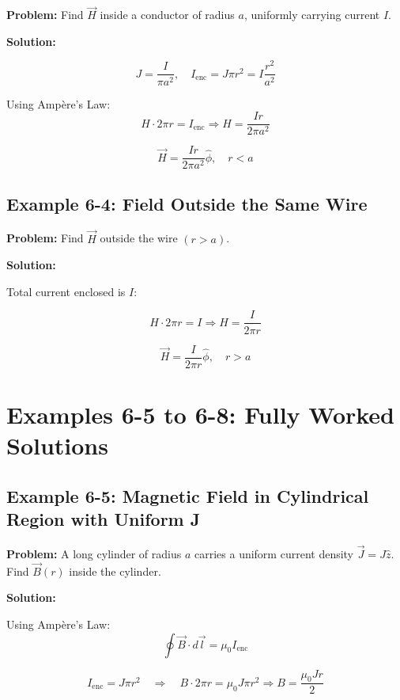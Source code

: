 \documentclass[12pt]{article}
\begin{document}
\textbf{Problem:}  
Find \( \vec{H} \) inside a conductor of radius \( a \), uniformly carrying current \( I \).

\textbf{Solution:}

\[
J = \frac{I}{\pi a^2}, \quad I_{\text{enc}} = J \pi r^2 = I \frac{r^2}{a^2}
\]

Using Ampère’s Law:
\[
H \cdot 2\pi r = I_{\text{enc}} \Rightarrow H = \frac{I r}{2\pi a^2}
\]

\begin{tcolorbox}
\[
\boxed{\vec{H} = \frac{I r}{2\pi a^2} \hat{\phi}}, \quad r < a
\]
\end{tcolorbox}

\subsection*{Example 6-4: Field Outside the Same Wire}

\textbf{Problem:}  
Find \( \vec{H} \) outside the wire \( (r > a) \).

\textbf{Solution:}

Total current enclosed is \( I \):

\[
H \cdot 2\pi r = I \Rightarrow H = \frac{I}{2\pi r}
\]

\begin{tcolorbox}
\[
\boxed{\vec{H} = \frac{I}{2\pi r} \hat{\phi}}, \quad r > a
\]
\end{tcolorbox}



\section*{Examples 6-5 to 6-8: Fully Worked Solutions}

\subsection*{Example 6-5: Magnetic Field in Cylindrical Region with Uniform J}

\textbf{Problem:}  
A long cylinder of radius \( a \) carries a uniform current density \( \vec{J} = J \hat{z} \). Find \( \vec{B}(r) \) inside the cylinder.

\textbf{Solution:}

Using Ampère’s Law:
\[
\oint \vec{B} \cdot d\vec{l} = \mu_0 I_{\text{enc}}
\]

\[
I_{\text{enc}} = J \pi r^2 \quad \Rightarrow \quad B \cdot 2\pi r = \mu_0 J \pi r^2
\Rightarrow B = \frac{\mu_0 J r}{2}
\]
\end{document}

